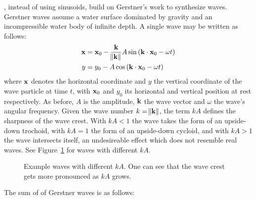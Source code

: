 \cite{Fournier:1986}, instead of using sinusoids, build on Gerstner's work
\citep{Gerstner:1809, Rankine:1863} to synthesize waves. Gerstner waves assume
a water surface dominated by gravity and an incompressible water body of
infinite depth. A single wave may be written as follows:
\begin{align}
\mathbf{x} &= \mathbf{x}_0 - \frac{\mathbf{k}}{\norm{\mathbf{k}}} A \sin\left(\mathbf{k}\cdot\mathbf{x}_0-\omega t\right)\\
y &= y_0 - A \cos\left(\mathbf{k}\cdot\mathbf{x}_0-\omega t\right)
\end{align}
where $\mathbf{x}$ denotes the horizontal coordinate and $y$ the vertical coordinate
of the wave particle at time $t$, with $\mathbf{x}_0$ and $y_0$ its horizontal
and vertical position at rest respectively. As before, $A$ is the amplitude,
$\mathbf{k}$ the wave vector and $\omega$ the wave's angular frequency. Given the
wave number $k=\norm{\mathbf{k}}$, the term $kA$ defines the sharpness of the wave
crest. With $kA<1$ the wave takes the form of an upside-down trochoid, with
$kA=1$ the form of an upside-down cycloid, and with $kA>1$ the wave intersects
itself, an undesireable effect which does not resemble real waves.
See Figure~\ref{fig:trochoid:crests} for waves with different $kA$.
%
\begin{figure}
\caption{Example waves with different $kA$. One can see that the wave crest gets more pronounced as $kA$ grows.}
\label{fig:trochoid:crests}
\end{figure}
%
The sum of of Gerstner waves is as follows:
